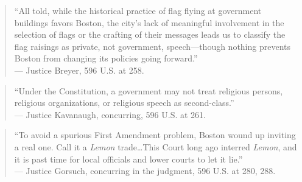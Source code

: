 \documentclass[12pt]{article}
\begin{document}
\begin{quote}
``All told, while the historical practice of flag flying at government buildings favors Boston, the city's lack of meaningful involvement in the selection of flags or the crafting of their messages leads us to classify the flag raisings as private, not government, speech---though nothing prevents Boston from changing its policies going forward.'' \\
--- Justice Breyer, 596 U.S. at 258.
\end{quote}

\begin{quote}
``Under the Constitution, a government may not treat religious persons, religious organizations, or religious speech as second-class.'' \\
--- Justice Kavanaugh, concurring, 596 U.S. at 261.
\end{quote}

\begin{quote}
``To avoid a spurious First Amendment problem, Boston wound up inviting a real one. Call it a \textit{Lemon} trade\ldots This Court long ago interred \textit{Lemon}, and it is past time for local officials and lower courts to let it lie.'' \\
--- Justice Gorsuch, concurring in the judgment, 596 U.S. at 280, 288.
\end{quote}
\end{document}
